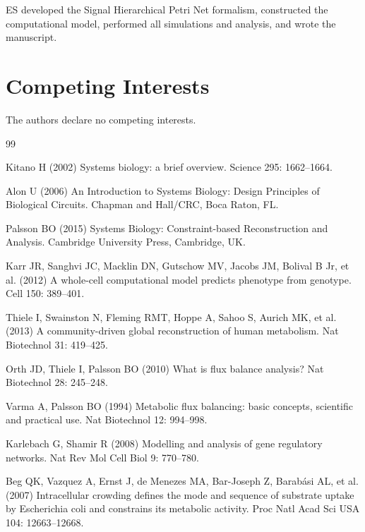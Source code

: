 \documentclass[10pt,letterpaper]{article}
\begin{document}
ES developed the Signal Hierarchical Petri Net formalism, constructed the computational model, performed all simulations and analysis, and wrote the manuscript.

\section*{Competing Interests}

The authors declare no competing interests.

\begin{thebibliography}{99}

Kitano H (2002) Systems biology: a brief overview. Science 295: 1662--1664.

Alon U (2006) An Introduction to Systems Biology: Design Principles of Biological Circuits. Chapman and Hall/CRC, Boca Raton, FL.

Palsson BO (2015) Systems Biology: Constraint-based Reconstruction and Analysis. Cambridge University Press, Cambridge, UK.

Karr JR, Sanghvi JC, Macklin DN, Gutschow MV, Jacobs JM, Bolival B Jr, et al. (2012) A whole-cell computational model predicts phenotype from genotype. Cell 150: 389--401.

Thiele I, Swainston N, Fleming RMT, Hoppe A, Sahoo S, Aurich MK, et al. (2013) A community-driven global reconstruction of human metabolism. Nat Biotechnol 31: 419--425.

Orth JD, Thiele I, Palsson BO (2010) What is flux balance analysis? Nat Biotechnol 28: 245--248.

Varma A, Palsson BO (1994) Metabolic flux balancing: basic concepts, scientific and practical use. Nat Biotechnol 12: 994--998.

Karlebach G, Shamir R (2008) Modelling and analysis of gene regulatory networks. Nat Rev Mol Cell Biol 9: 770--780.

Beg QK, Vazquez A, Ernst J, de Menezes MA, Bar-Joseph Z, Barabási AL, et al. (2007) Intracellular crowding defines the mode and sequence of substrate uptake by Escherichia coli and constrains its metabolic activity. Proc Natl Acad Sci USA 104: 12663--12668.


\end{thebibliography}
\end{document}

